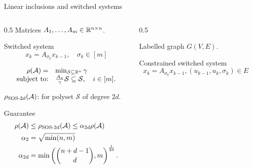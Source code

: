 \documentclass[9pt,notes=hide]{beamer}
\begin{document}
\begin{frame}{Linear inclusions and switched systems}
  \begin{columns}
    \begin{column}{0.5\textwidth}
      Matrices $A_1, \ldots, A_m \in \mathbb{R}^{n \times n}$.
      \begin{block}{Switched system}
        \begin{equation*}
          x_k = A_{\sigma_k} x_{k-1}, \quad \sigma_k \in [m]
        \end{equation*}
      \end{block}

      \vspace{-1em}

      \begin{equation*}
        \begin{array}{rl}
          \rho(\mathcal{A}) = & \min_{\mathcal{S} \subseteq \mathbb{R}^{n}}\gamma\\
          \text{subject to:} & \frac{A_\sigma}{\gamma} \mathcal{S} \subseteq \mathcal{S}, \quad i \in [m].
        \end{array}
      \end{equation*}

      \vspace{1em}

      $\rho_{\text{SOS-}2d}(\mathcal{A})$: for polyset $\mathcal{S}$ of degree $2d$.

      \vspace{0.4em}

      \begin{block}{Guarantee}
        \vspace{-1em}
        \begin{align*}
          \rho(\mathcal{A}) & \le \rho_{\text{SOS-}2d}(\mathcal{A}) \le \alpha_{2d} \rho(\mathcal{A})\\
          \alpha_2 & = \sqrt{\min(n, m)}\\
          \alpha_{2d} & = \min\left({n+d-1 \choose d}, m\right)^{\frac{1}{2d}}.
        \end{align*}
      \end{block}
    \end{column}
    \begin{column}{0.5\textwidth}

      Labelled graph $G(V, E)$.
      \begin{block}{Constrained switched system}
        \begin{equation*}
          x_k = A_{\sigma_k} x_{k-1},
          (u_{k-1}, u_k, \sigma_k) \in E
        \end{equation*}
      \end{block}


\end{column}
\end{columns}
\end{frame}
\end{document}
